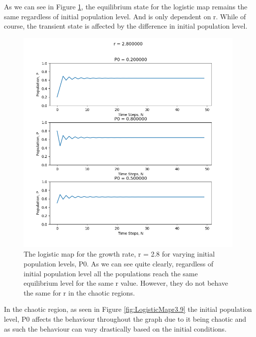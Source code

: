\documentclass[11pt,a4paper]{CLabBookTemplate} %
\begin{document}
As we can see in Figure \ref{fig:LogisticMapr3.2}, the equilibrium state for the logistic map remains the same regardless of initial population level. And is only dependent on r. While of course, the transient state is affected by the difference in initial population level. 
\begin{figure}[h!]
	\centering
	\includegraphics[width = 120mm]{Figures/DLMr3.png}
	\caption{The logistic map for the growth rate, r = 2.8 for varying initial population levels, P0. As we can see quite clearly, regardless of initial population level all the populations reach the same equilibrium level for the same r value. However, they do not behave the same for r in the chaotic regions.}
	\label{fig:LogisticMapr3.2}
\end{figure}
In the chaotic region, as seen in Figure \ref{fig:LogisticMapr3.9} the initial population level, P0 affects the behaviour throughout the graph due to it being chaotic and as such the behaviour can vary drastically based on the initial conditions. 
\end{document}
